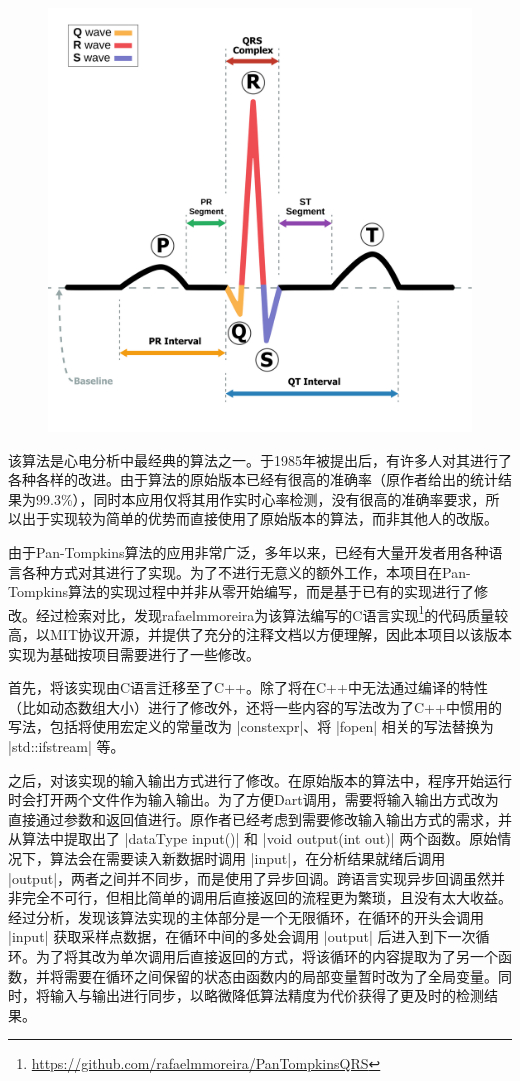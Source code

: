 \begin{figure}[ht]
    \centering
    \includegraphics[width=.75\textwidth]{../assets/SinusRhythmLabels}
    \label{fig:sinus-rhythm}
\end{figure}

该算法是心电分析中最经典的算法之一。于1985年被提出后，有许多人对其进行了各种各样的改进。由于算法的原始版本已经有很高的准确率（原作者给出的统计结果为99.3\%），同时本应用仅将其用作实时心率检测，没有很高的准确率要求，所以出于实现较为简单的优势而直接使用了原始版本的算法，而非其他人的改版。

由于Pan-Tompkins算法的应用非常广泛，多年以来，已经有大量开发者用各种语言各种方式对其进行了实现。为了不进行无意义的额外工作，本项目在Pan-Tompkins算法的实现过程中并非从零开始编写，而是基于已有的实现进行了修改。经过检索对比，发现rafaelmmoreira为该算法编写的C语言实现\footnote{\url{https://github.com/rafaelmmoreira/PanTompkinsQRS}}的代码质量较高，以MIT协议开源，并提供了充分的注释文档以方便理解，因此本项目以该版本实现为基础按项目需要进行了一些修改。

首先，将该实现由C语言迁移至了C++。除了将在C++中无法通过编译的特性（比如动态数组大小）进行了修改外，还将一些内容的写法改为了C++中惯用的写法，包括将使用宏定义的常量改为 |constexpr|、将 |fopen| 相关的写法替换为 |std::ifstream| 等。

之后，对该实现的输入输出方式进行了修改。在原始版本的算法中，程序开始运行时会打开两个文件作为输入输出。为了方便Dart调用，需要将输入输出方式改为直接通过参数和返回值进行。原作者已经考虑到需要修改输入输出方式的需求，并从算法中提取出了 |dataType input()| 和 |void output(int out)| 两个函数。原始情况下，算法会在需要读入新数据时调用 |input|，在分析结果就绪后调用 |output|，两者之间并不同步，而是使用了异步回调。跨语言实现异步回调虽然并非完全不可行，但相比简单的调用后直接返回的流程更为繁琐，且没有太大收益。经过分析，发现该算法实现的主体部分是一个无限循环，在循环的开头会调用 |input| 获取采样点数据，在循环中间的多处会调用 |output| 后进入到下一次循环。为了将其改为单次调用后直接返回的方式，将该循环的内容提取为了另一个函数，并将需要在循环之间保留的状态由函数内的局部变量暂时改为了全局变量。同时，将输入与输出进行同步，以略微降低算法精度为代价获得了更及时的检测结果。

